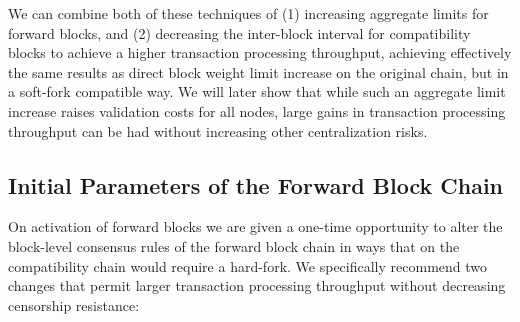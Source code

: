 We can combine both of these techniques of (1) increasing aggregate
limits for forward blocks, and (2) decreasing the inter-block interval
for compatibility blocks to achieve a higher transaction processing
throughput, achieving effectively the same results as direct block
weight limit increase on the original chain, but in a soft-fork
compatible way.  We will later show that while such an aggregate limit
increase raises validation costs for all nodes, large gains in
transaction processing throughput can be had without increasing other
centralization risks.

\subsection{Initial Parameters of the Forward Block Chain}

On activation of forward blocks we are given a one-time opportunity to
alter the block-level consensus rules of the forward block chain in
ways that on the compatibility chain would require a hard-fork.  We
specifically recommend two changes that permit larger transaction
processing throughput without decreasing censorship resistance:

